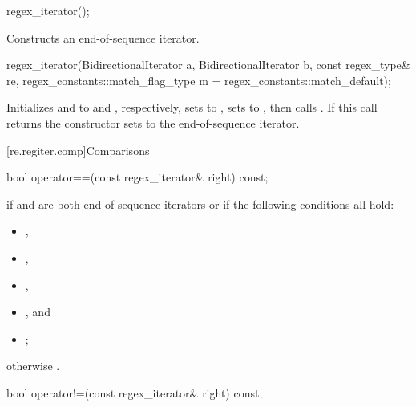 %
\begin{itemdecl}
regex_iterator();
\end{itemdecl}

\begin{itemdescr}
\pnum\effects  Constructs an end-of-sequence iterator.
\end{itemdescr}

%
\begin{itemdecl}
regex_iterator(BidirectionalIterator a, BidirectionalIterator b,
               const regex_type& re,
               regex_constants::match_flag_type m = regex_constants::match_default);
\end{itemdecl}

\begin{itemdescr}
\pnum\effects  Initializes  and  to
 and , respectively, sets
 to , sets  to
, then calls . If this
call returns  the constructor sets  to the end-of-sequence
iterator.
\end{itemdescr}

[re.regiter.comp]{Comparisons}

%
\begin{itemdecl}
bool operator==(const regex_iterator& right) const;
\end{itemdecl}

\begin{itemdescr}
\pnum
\returns {} if  and  are both end-of-sequence
iterators or if the following conditions all hold:
\begin{itemize}
\item {},
\item {},
\item {},
\item {}, and
\item {};
\end{itemize}
otherwise .
\end{itemdescr}

%
\begin{itemdecl}
bool operator!=(const regex_iterator& right) const;
\end{itemdecl}

